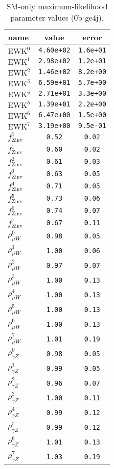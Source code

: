 %

\begin{table}\centering
\caption{SM-only maximum-likelihood parameter values (0b ge4j).}
\label{tab:mlParameterValues0b_ge4j}
\begin{tabular}{lcc}name & value & error \\ \hline
$\mathrm{EWK}^{0}$ & {\tt  4.60e+02} & {\tt  1.6e+01}\\
$\mathrm{EWK}^{1}$ & {\tt  2.98e+02} & {\tt  1.2e+01}\\
$\mathrm{EWK}^{2}$ & {\tt  1.46e+02} & {\tt  8.2e+00}\\
$\mathrm{EWK}^{3}$ & {\tt  6.59e+01} & {\tt  5.7e+00}\\
$\mathrm{EWK}^{4}$ & {\tt  2.71e+01} & {\tt  3.3e+00}\\
$\mathrm{EWK}^{5}$ & {\tt  1.39e+01} & {\tt  2.2e+00}\\
$\mathrm{EWK}^{6}$ & {\tt  6.47e+00} & {\tt  1.5e+00}\\
$\mathrm{EWK}^{7}$ & {\tt  3.19e+00} & {\tt  9.5e-01}\\
$f_\mathrm{Zinv}^{0}$ & {\tt 0.52} & {\tt 0.02}\\
$f_\mathrm{Zinv}^{1}$ & {\tt 0.60} & {\tt 0.02}\\
$f_\mathrm{Zinv}^{2}$ & {\tt 0.61} & {\tt 0.03}\\
$f_\mathrm{Zinv}^{3}$ & {\tt 0.63} & {\tt 0.05}\\
$f_\mathrm{Zinv}^{4}$ & {\tt 0.71} & {\tt 0.05}\\
$f_\mathrm{Zinv}^{5}$ & {\tt 0.73} & {\tt 0.06}\\
$f_\mathrm{Zinv}^{6}$ & {\tt 0.74} & {\tt 0.07}\\
$f_\mathrm{Zinv}^{7}$ & {\tt 0.67} & {\tt 0.11}\\
$\rho_{\mu W}^{0}$ & {\tt 0.98} & {\tt 0.05}\\
$\rho_{\mu W}^{1}$ & {\tt 1.00} & {\tt 0.06}\\
$\rho_{\mu W}^{2}$ & {\tt 0.97} & {\tt 0.07}\\
$\rho_{\mu W}^{3}$ & {\tt 1.00} & {\tt 0.13}\\
$\rho_{\mu W}^{4}$ & {\tt 1.00} & {\tt 0.13}\\
$\rho_{\mu W}^{5}$ & {\tt 1.00} & {\tt 0.13}\\
$\rho_{\mu W}^{6}$ & {\tt 1.00} & {\tt 0.13}\\
$\rho_{\mu W}^{7}$ & {\tt 1.01} & {\tt 0.19}\\
$\rho_{\gamma Z}^{0}$ & {\tt 0.98} & {\tt 0.05}\\
$\rho_{\gamma Z}^{1}$ & {\tt 0.99} & {\tt 0.05}\\
$\rho_{\gamma Z}^{2}$ & {\tt 0.96} & {\tt 0.07}\\
$\rho_{\gamma Z}^{3}$ & {\tt 1.00} & {\tt 0.11}\\
$\rho_{\gamma Z}^{4}$ & {\tt 0.99} & {\tt 0.12}\\
$\rho_{\gamma Z}^{5}$ & {\tt 0.99} & {\tt 0.12}\\
$\rho_{\gamma Z}^{6}$ & {\tt 1.01} & {\tt 0.13}\\
$\rho_{\gamma Z}^{7}$ & {\tt 1.03} & {\tt 0.19}\\
\hline
\end{tabular}
\end{table}
%